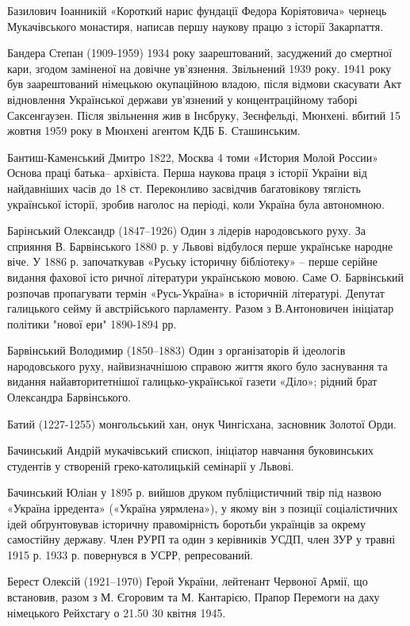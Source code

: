 Базилович Іоанникій «Короткий нарис фундації Федора Коріятовича» чернець Мукачівського монастиря, написав першу наукову працю з історії Закарпаття.

Бандера Степан (1909-1959) 1934 року заарештований, засуджений до смертної кари, згодом заміненої на довічне ув'язнення. Звільнений 1939 року. 1941 року був заарештований німецькою окупаційною владою, після відмови скасувати Акт відновлення Української держави ув'язнений у концентраційному таборі Саксенгаузен. Після звільнення жив в Інсбруку, Зеєнфельді, Мюнхені. вбитий 15 жовтня 1959 року в Мюнхені агентом КДБ Б. Сташинським. 

Бантиш-Каменський Дмитро 1822, Москва 4 томи «История Молой России» Основа праці батька– архівіста. Перша наукова праця з історії України від найдавніших часів до 18 ст. Переконливо засвідчив багатовікову тяглість української історії, зробив наголос на періоді, коли Україна була автономною.

Барінський Олександр (1847–1926) Один з лідерів народовського руху. За сприяння В. Барвінського 1880 р. у Львові відбулося перше українське народне віче. У 1886 р. започаткував «Руську історичну бібліотеку» – перше серійне видання фахової істо ричної літератури українською мовою. Саме О. Барвінський розпочав пропагувати термін «Русь-Україна» в історичній літературі. Депутат галицького сейму й австрійського парламенту. Разом з В.Антоновичен ініціатар політики "нової ери" 1890-1894 рр. 

Барвінський Володимир (1850–1883) Один з організаторів й ідеологів народовського руху, найвизначнішою справою життя якого було заснування та видання найавторитетнішої галицько-української газети «Діло»; рідний брат Олександра Барвінського. 

Батий (1227-1255) монгольський хан, онук Чингісхана, засновник Золотої Орди.

Бачинський Андрій мукачівський єпископ, ініціатор навчання буковинських студентів у створеній греко-католицькій семінарії у Львові.

Бачинський Юліан у 1895 р. вийшов друком публіцистичний твір під назвою «Україна ірредента» («Україна уярмлена»), у якому він з позиції соціалістичних ідей обґрунтовував історичну правомірність боротьби українців за окрему самостійну державу. Член РУРП та один з керівників УСДП, член ЗУР у травні 1915 р. 1933 р. повернувся в УСРР, репресований.

Берест Олексій (1921–1970) Герой України, лейтенант Червоної Армії, що встановив, разом з М. Єгоровим та М. Кантарією, Прапор Перемоги на даху німецького Рейхстагу о 21.50 30 квітня 1945.

